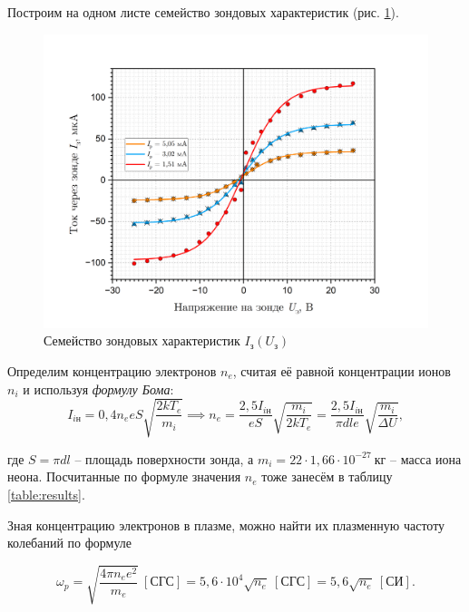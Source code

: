 \documentclass[a4paper, 12pt]{article}
\begin{document}
    Построим на одном листе семейство зондовых характеристик (рис. \ref{graph:probes}).

    \begin{figure}[H]
        \centering
        \includegraphics[width = 14 cm]{images/graph_probes.png}
        \caption{Семейство зондовых характеристик $I_{\text{з}}\left(U_{\text{з}}\right)$} 
        \label{graph:probes}
    \end{figure}
    
    Определим концентрацию электронов $n_e$, считая её равной концентрации ионов $n_i$ и используя \textit{формулу Бома}:
    \begin{equation}
        I_{i\text{н}} = 0,4n_e eS \sqrt{\frac{2kT_e}{m_i}} \implies n_e = \frac{2,5I_{i\text{н}}}{eS} \sqrt{\frac{m_i}{2kT_e}} = \frac{2,5I_{i\text{н}}}{\pi dle}\sqrt{\frac{m_i}{\Delta U}},
    \end{equation}
    
    где $S=\pi dl$ -- площадь поверхности зонда, а $m_i=22\cdot1,66\cdot10^{-27}~\text{кг}$ -- масса иона неона. Посчитанные по формуле значения $n_e$ тоже занесём в таблицу \ref{table:results}.

    Зная концентрацию электронов в плазме, можно найти их плазменную частоту колебаний по формуле

    \begin{equation}
        \omega_p = \sqrt{\frac{4\pi n_ee^2}{m_e}}\ \left[\text{СГС}\right] = 5,6 \cdot 10^4 \sqrt{n_e}\ \left[\text{СГС}\right] = 5,6 \sqrt{n_e}\ \left[\text{СИ}\right].
    \end{equation}
    
\end{document}
